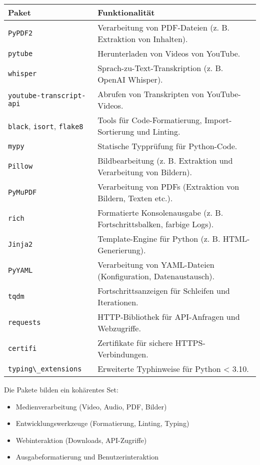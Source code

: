\documentclass{vorlage-design-main}
\begin{document}
\begin{table}[ht]
  \begin{tabular}{@{}ll@{}}
\toprule
\textbf{Paket}
 & 
\textbf{Funktionalität}
 \\
\midrule[\heavyrulewidth]
\verb|PyPDF2| & Verarbeitung von PDF-Dateien (z. B.
Extraktion von Inhalten). \\
\verb|pytube| & Herunterladen von Videos von
YouTube. \\
\verb|whisper| & Sprach-zu-Text-Transkription (z. B.
OpenAI Whisper). \\
\verb|youtube-transcript-api| & Abrufen von
Transkripten von YouTube-Videos. \\
\verb|black|, \verb|isort|,
\verb|flake8| & Tools für Code-Formatierung,
Import-Sortierung und Linting. \\
\verb|mypy| & Statische Typprüfung für
Python-Code. \\
\verb|Pillow| & Bildbearbeitung (z. B. Extraktion und
Verarbeitung von Bildern). \\
\verb|PyMuPDF| & Verarbeitung von PDFs (Extraktion
von Bildern, Texten etc.). \\
\verb|rich| & Formatierte Konsolenausgabe (z. B.
Fortschrittsbalken, farbige Logs). \\
\verb|Jinja2| & Template-Engine für Python (z. B.
HTML-Generierung). \\
\verb|PyYAML| & Verarbeitung von YAML-Dateien
(Konfiguration, Datenaustausch). \\
\verb|tqdm| & Fortschrittsanzeigen für Schleifen und
Iterationen. \\
\verb|requests| & HTTP-Bibliothek für API-Anfragen
und Webzugriffe. \\
\verb|certifi| & Zertifikate für sichere
HTTPS-Verbindungen. \\
\verb|typing\_extensions| & Erweiterte Typhinweise
für Python \textless{} 3.10. \\
\bottomrule
\end{tabular}%
\end{table}

Die Pakete bilden ein kohärentes Set:

\begin{itemize}

\item
  Medienverarbeitung (Video, Audio, PDF, Bilder)
\item
  Entwicklungswerkzeuge (Formatierung, Linting, Typing)
\item
  Webinteraktion (Downloads, API-Zugriffe)
\item
  Ausgabeformatierung und Benutzerinteraktion
\end{itemize}
\end{document}
